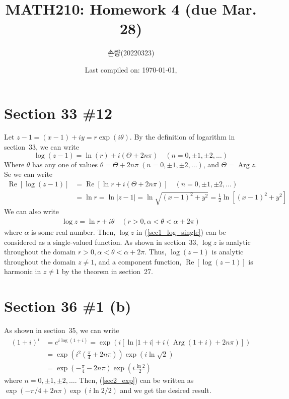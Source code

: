 \documentclass{scrartcl}
\title{MATH210: Homework 4 (due Mar. 28)}
\author{손량(20220323)}
\date{Last compiled on: \today, \currenttime}
\begin{document}
\maketitle

\section{Section 33 \#12}
Let \(z - 1 = (x - 1) + iy = r\exp(i\theta)\).
By the definition of logarithm in section~33, we can write
\[
  \log (z - 1) = \ln (r) + i(\Theta + 2n\pi) \quad (n = 0, \pm 1, \pm 2, \dots)
\]
Where \(\theta\) has any one of values \(\theta = \Theta + 2n\pi\; (n = 0, \pm 1, \pm 2, \dots)\), and \(\Theta = \operatorname{Arg} z\).
Se we can write
\begin{align*}
  \operatorname{Re} [\log (z - 1)] &= \operatorname{Re} [\ln r + i(\Theta + 2n\pi)] \quad (n = 0, \pm 1, \pm 2, \dots) \\
                                   &= \ln r = \ln |z - 1| = \ln \sqrt{(x - 1)^2 + y^2} = \frac{1}{2} \ln [(x - 1)^2 + y^2]
\end{align*}
We can also write
\begin{align}\label{sec1_log_single}
  \log z = \ln r + i\theta \quad (r > 0, \alpha < \theta < \alpha + 2\pi)
\end{align}
where \(\alpha\) is some real number.
Then, \(\log z\) in (\ref{sec1_log_single}) can be considered as a single-valued function.
As shown in section~33, \(\log z\) is analytic throughout the domain \(r > 0, \alpha < \theta < \alpha + 2\pi\).
Thus, \(\log (z - 1)\) is analytic throughout the domain \(z \not = 1\), and a component function, \(\operatorname{Re} [\log (z - 1)]\) is harmonic in \(z \not = 1\) by the theorem in section~27.

\section{Section 36 \#1 (b)}
As shown in section~35, we can write
\begin{align}
  \nonumber (1 + i)^i &= e^{i\log (1 + i)} = \exp(i[\ln |1 + i| + i(\operatorname{Arg} (1 + i) + 2n\pi)]) \\
  \nonumber           &= \exp \left( i^2 \left( \frac{\pi}{4} + 2n\pi \right) \right) \exp(i\ln \sqrt{2}) \\
  \label{sec2_exp}    &= \exp \left( -\frac{\pi}{4} - 2n\pi \right) \exp \left( i \frac{\ln 2}{2} \right)
\end{align}
where \(n = 0, \pm 1, \pm 2, \dots\).
Then, (\ref{sec2_exp}) can be written as \(\exp (-\pi / 4 + 2n\pi) \exp (i \ln 2 / 2)\) and we get the desired result.
\end{document}
